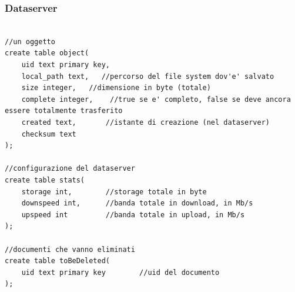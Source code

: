 \documentclass{article}
\begin{document}
\subsubsection{Dataserver}

\begin{lstlisting}[title=Struttura]

//un oggetto
create table object(
    uid text primary key,
    local_path text,   //percorso del file system dov'e' salvato
    size integer,   //dimensione in byte (totale)
    complete integer,    //true se e' completo, false se deve ancora essere totalmente trasferito
    created text,       //istante di creazione (nel dataserver)
    checksum text
);

//configurazione del dataserver
create table stats(
    storage int,        //storage totale in byte
    downspeed int,      //banda totale in download, in Mb/s
    upspeed int         //banda totale in upload, in Mb/s 
);

//documenti che vanno eliminati
create table toBeDeleted(
    uid text primary key        //uid del documento
);


\end{lstlisting}
\end{document}
